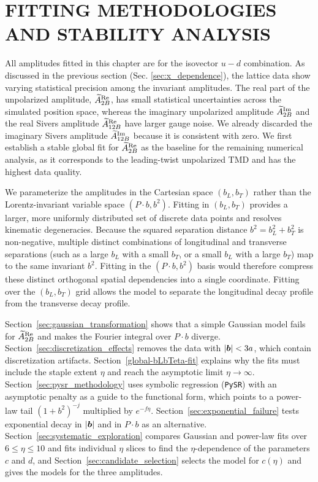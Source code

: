 \section{FITTING METHODOLOGIES AND STABILITY ANALYSIS}
\label{sec:fitting_methodologies}

All amplitudes fitted in this chapter are for the isovector $u-d$ combination. As discussed in the previous section (Sec. \ref{sec:x_dependence}), the lattice data show varying statistical precision among the invariant amplitudes. The real part of the unpolarized amplitude, $\widetilde{A}_{2B}^{\text{Re}}$, has small statistical uncertainties across the simulated position space, whereas the imaginary unpolarized amplitude $\widetilde{A}_{2B}^{\text{Im}}$ and the real Sivers amplitude $\widetilde{A}_{12B}^{\text{Re}}$ have larger gauge noise. We already discarded the imaginary Sivers amplitude $\widetilde{A}_{12B}^{\text{Im}}$ because it is consistent with zero. We first establish a stable global fit for $\widetilde{A}_{2B}^{\text{Re}}$ as the baseline for the remaining numerical analysis, as it corresponds to the leading-twist unpolarized TMD and has the highest data quality.

We parameterize the amplitudes in the Cartesian space $(b_L, b_T)$ rather than the Lorentz-invariant variable space $(P \cdot b, b^2)$. Fitting in $(b_L, b_T)$ provides a larger, more uniformly distributed set of discrete data points and resolves kinematic degeneracies. Because the squared separation distance $b^2 = b_L^2 + b_T^2$ is non-negative, multiple distinct combinations of longitudinal and transverse separations (such as a large $b_L$ with a small $b_T$, or a small $b_L$ with a large $b_T$) map to the same invariant $b^2$. Fitting in the $(P \cdot b, b^2)$ basis would therefore compress these distinct orthogonal spatial dependencies into a single coordinate. Fitting over the $(b_L, b_T)$ grid allows the model to separate the longitudinal decay profile from the transverse decay profile. 

Section~\ref{sec:gaussian_transformation} shows that a simple Gaussian model fails for $\widetilde{A}_{2B}^{\text{Re}}$ and makes the Fourier integral over $P\cdot b$ diverge. Section~\ref{sec:discretization_effects} removes the data with $|\boldsymbol{b}|<3a$, which contain discretization artifacts. Section~\ref{global-bLbTeta-fit} explains why the fits must include the staple extent $\eta$ and reach the asymptotic limit $\eta\to\infty$. Section~\ref{sec:pysr_methodology} uses symbolic regression (\texttt{PySR}) with an asymptotic penalty as a guide to the functional form, which points to a power-law tail $(1+b^2)^{-j}$ multiplied by $e^{-f\eta}$. Section~\ref{sec:exponential_failure} tests exponential decay in $|\boldsymbol{b}|$ and in $P\cdot b$ as an alternative. Section~\ref{sec:systematic_exploration} compares Gaussian and power-law fits over $6\leq\eta\leq10$ and fits individual $\eta$ slices to find the $\eta$-dependence of the parameters $c$ and $d$, and Section~\ref{sec:candidate_selection} selects the model for $c(\eta)$ and gives the models for the three amplitudes.

